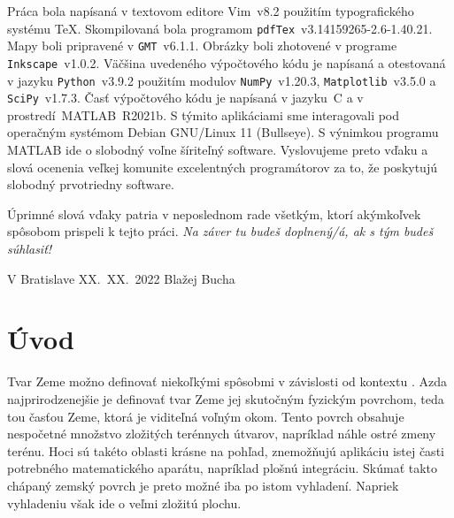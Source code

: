 \documentclass[a4paper, 12pt]{book}
\begin{document}
Práca bola napísaná v textovom editore Vim~v8.2 použitím typografického systému 
\TeX.  Skompilovaná bola programom \texttt{pdfTex}~v3.14159265-2.6-1.40.21.  
Mapy boli pripravené v \texttt{GMT}~v6.1.1.  Obrázky boli zhotovené v programe 
\texttt{Inkscape}~v1.0.2.  Väčšina uvedeného výpočtového kódu je napísaná 
a otestovaná v jazyku \texttt{Python}~v3.9.2 použitím modulov 
\texttt{NumPy}~v1.20.3, \texttt{Matplotlib}~v3.5.0 a \texttt{SciPy}~v1.7.3.  
Časť výpočtového kódu je napísaná v jazyku~C a v prostredí~MATLAB~R2021b.  
S týmito aplikáciami sme interagovali pod operačným systémom Debian GNU/Linux 
11 (Bullseye).  S výnimkou programu MATLAB ide o slobodný voľne šíriteľný 
software.  Vyslovujeme preto vďaku a slová ocenenia veľkej komunite 
excelentných programátorov za to, že poskytujú slobodný prvotriedny software.

Úprimné slová vďaky patria v neposlednom rade všetkým, ktorí akýmkoľvek 
spôsobom prispeli k tejto práci. \emph{Na záver tu budeš doplnený/á, ak s tým 
budeš súhlasiť!}


\vspace{4ex}

\noindent V Bratislave XX.~XX.~2022 \hfill Blažej Bucha






\tableofcontents
\newpage







\chapter{Úvod}

Tvar Zeme možno definovať niekoľkými spôsobmi v závislosti od kontextu 
\citep{MoritzTheFigureOfTheEarth}.  Azda najprirodzenejšie je definovať tvar 
Zeme jej skutočným fyzickým povrchom, teda tou časťou Zeme, ktorá je viditeľná 
voľným okom.  Tento povrch obsahuje nespočetné množstvo zložitých terénnych 
útvarov, napríklad náhle ostré zmeny terénu.  Hoci sú takéto oblasti krásne na 
pohľad, znemožňujú aplikáciu istej časti potrebného matematického aparátu, 
napríklad plošnú integráciu.  Skúmať takto chápaný zemský povrch je preto možné 
iba po istom vyhladení.  Napriek vyhladeniu však ide o veľmi zložitú plochu.
\end{document}
